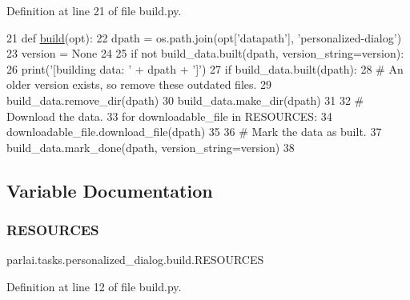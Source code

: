 Definition at line 21 of file build.\+py.


\begin{DoxyCode}
21 \textcolor{keyword}{def }\hyperlink{namespacedialog__babi__feedback_1_1build_a7a9d289f7493a5ded13c4b7f071b6184}{build}(opt):
22     dpath = os.path.join(opt[\textcolor{stringliteral}{'datapath'}], \textcolor{stringliteral}{'personalized-dialog'})
23     version = \textcolor{keywordtype}{None}
24 
25     \textcolor{keywordflow}{if} \textcolor{keywordflow}{not} build\_data.built(dpath, version\_string=version):
26         print(\textcolor{stringliteral}{'[building data: '} + dpath + \textcolor{stringliteral}{']'})
27         \textcolor{keywordflow}{if} build\_data.built(dpath):
28             \textcolor{comment}{# An older version exists, so remove these outdated files.}
29             build\_data.remove\_dir(dpath)
30         build\_data.make\_dir(dpath)
31 
32         \textcolor{comment}{# Download the data.}
33         \textcolor{keywordflow}{for} downloadable\_file \textcolor{keywordflow}{in} RESOURCES:
34             downloadable\_file.download\_file(dpath)
35 
36         \textcolor{comment}{# Mark the data as built.}
37         build\_data.mark\_done(dpath, version\_string=version)
38 \end{DoxyCode}


\subsection{Variable Documentation}
\mbox{\label{namespaceparlai_1_1tasks_1_1personalized__dialog_1_1build_ae47eba405e350fc035778ff781c48252}} 
\subsubsection{\texorpdfstring{R\+E\+S\+O\+U\+R\+C\+ES}{RESOURCES}}
{\footnotesize\ttfamily parlai.\+tasks.\+personalized\+\_\+dialog.\+build.\+R\+E\+S\+O\+U\+R\+C\+ES}



Definition at line 12 of file build.\+py.


